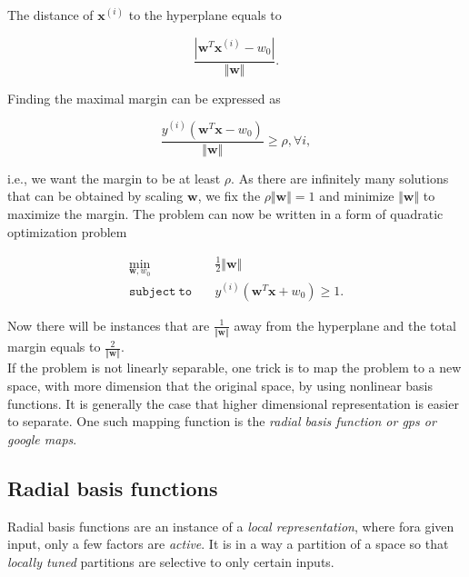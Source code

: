 The distance of $\mathbf{x}^{(i)}$ to the hyperplane equals to 

\begin{equation}
	\frac{ | \mathbf{w}^T\mathbf{x}^{(i)} - w_0 | }{ \Vert \mathbf{w} \Vert}.
\end{equation}

Finding the maximal margin can be expressed as

\begin{equation}
	\frac{y^{(i)}(\mathbf{w}^T\mathbf{x} - w_0)}{\Vert \mathbf{w} \Vert} \geq \rho, \forall i,
\end{equation}

i.e., we want the margin to be at least $\rho$. As there are infinitely many solutions that can be obtained by scaling $\mathbf{w}$, we fix the $\rho \Vert \mathbf{w} \Vert = 1$ and minimize $\Vert \mathbf{w} \Vert$ to maximize the margin. The problem can now be written in a form of quadratic optimization problem

\begin{align*}
	\min_{\mathbf{w}, w_0} & \quad \frac{1}{2} \Vert \mathbf{w} \Vert \\
	\mathtt{subject \ to} & \quad  y^{(i)} \left ( \mathbf{w}^T\mathbf{x} + w_0  \right ) \geq 1.
\end{align*}

Now there will be instances that are $\frac{1}{\Vert \mathbf{w} \Vert}$ away from the hyperplane and the total margin equals to $\frac{2}{\Vert \mathbf{w} \Vert}$. \\

If the problem is not linearly separable, one trick is to map the problem to a new space, with more dimension that the original space, by using nonlinear basis functions. It is generally the case that higher dimensional representation is easier to separate. One such mapping function is the \textit{radial basis function or gps or google maps}. 


 
\subsection{Radial basis functions}

Radial basis functions are an instance of a \textit{local representation}, where fora given input, only a few factors are \textit{active}. It is in a way a partition of a space so that \textit{locally tuned} partitions are selective to only certain inputs. \\

